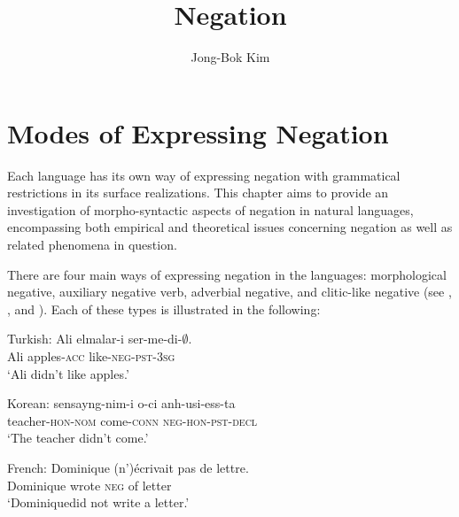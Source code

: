 \documentclass[output=paper]{langsci/langscibook}
\author{Jong-Bok Kim\affiliation{Kyung Hee University, Seoul}}
\title{Negation}
\begin{document}
\label{chap-negation}


{

\section{Modes of Expressing Negation}

Each language has its own way of expressing negation
with grammatical restrictions in its surface realizations.
This
chapter aims to provide an investigation of morpho-syntactic aspects
of negation in natural languages, encompassing both empirical and
theoretical issues  concerning negation as well as related phenomena
in question.


There are four main ways of expressing negation in the
languages: morphological negative,
auxiliary negative verb, adverbial negative, and clitic-like negative (see \citet{Dahl:79}, \citet{Payne:85}, and \citet{Dryer:05}).
Each of these types is illustrated in the following:

\eal
\ex \label{1a} Turkish:
\gll Ali  elmalar-i  ser-me-di-$\emptyset$. \\
Ali apples-\textsc{acc}  like-\textsc{neg}-\textsc{pst}-\textsc{3sg} \\
\glt `Ali didn't like apples.'

\ex \label{1b} Korean:
\gll sensayng-nim-i o-ci anh-usi-ess-ta \\
teacher-\textsc{hon}-\textsc{nom} come-\textsc{conn} \textsc{neg}-\textsc{hon}-\textsc{pst}-\textsc{decl} \\
\glt `The teacher didn't come.'

\ex \label{1c} French:
\gll Dominique (n')\'{e}crivait pas de lettre.\\
Dominique wrote \textsc{neg} of letter \\
\glt `Dominiquedid not write a letter.'

}
\end{document}
